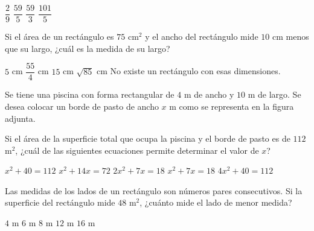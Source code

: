 \documentclass[borrador]{srs3}
\begin{document}
\begin{preguntas}
\begin{alternativas}
\alternativa \( \dfrac{2}{9} \)
\alternativa \( \dfrac{59}{5} \)
\alternativa \( \dfrac{59}{3} \)
\alternativa \( \dfrac{101}{5} \)
\end{alternativas}
\pregunta Si el área de un rectángulo es \(75\) cm\(^2\) y el ancho del rectángulo mide \(10\) cm menos que su largo, ¿cuál es la medida de su largo?
\begin{alternativas}
\alternativa \(5\) cm
\alternativa \( \dfrac{55}{4} \) cm
\alternativa \(15\) cm
\alternativa \( \sqrt{85} \) cm
\alternativa No existe un rectángulo con esas dimensiones.
\end{alternativas}

\pregunta Se tiene una piscina con forma rectangular de \(4\) m de ancho y \(10\) m de largo. Se desea colocar un borde de pasto de ancho \(x\) m como se representa en la figura adjunta.
\begin{columnas}[0.6][t]
Si el área de la superficie total que ocupa la piscina y el borde de pasto es de \(112\) m\(^2\), ¿cuál de las siguientes ecuaciones permite determinar el valor de \(x\)?
\begin{alternativas}
\alternativa \( x^2+40=112 \)
\alternativa \( x^2+14x=72 \)
\alternativa \( 2x^2+7x=18 \)
\alternativa \( x^2+7x=18 \)
\alternativa \( 4x^2+40=112 \)
\end{alternativas}
\siguiente
{}
\end{columnas}
\pregunta Las medidas de los lados de un rectángulo son números pares consecutivos. Si la superficie del rectángulo mide \(48\) m\(^2\), ¿cuánto mide el lado de menor medida?
\begin{alternativas}
\alternativa \(4\) m
\alternativa \(6\) m
\alternativa \(8\) m
\alternativa \(12\) m
\alternativa \(16\) m
\end{alternativas}


\end{preguntas}
\end{document}
